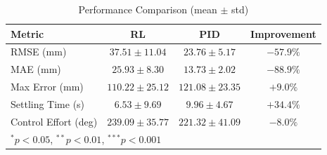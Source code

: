 \begin{table}[h]
\centering
\caption{Performance Comparison (mean $\pm$ std)}
\label{tab:performance}
\begin{tabular}{lccc}
\hline
Metric & RL & PID & Improvement \\
\hline
RMSE (mm) & $37.51 \pm 11.04$ & $23.76 \pm 5.17$ & $-57.9\%$ \\
MAE (mm) & $25.93 \pm 8.30$ & $13.73 \pm 2.02$ & $-88.9\%$ \\
Max Error (mm) & $110.22 \pm 25.12$ & $121.08 \pm 23.35$ & $+9.0\%$ \\
Settling Time (s) & $6.53 \pm 9.69$ & $9.96 \pm 4.67$ & $+34.4\%$ \\
Control Effort (deg) & $239.09 \pm 35.77$ & $221.32 \pm 41.09$ & $-8.0\%$ \\
\hline
\multicolumn{4}{l}{\footnotesize $^{*}p<0.05$, $^{**}p<0.01$, $^{***}p<0.001$} \\
\end{tabular}
\end{table}